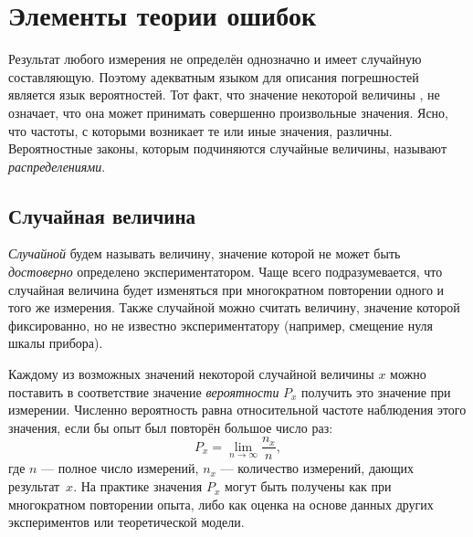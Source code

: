 \chapter{Элементы теории ошибок}
\label{ch:prob}


Результат любого измерения не определён однозначно и имеет случайную составляющую.
Поэтому адекватным языком для описания погрешностей является язык вероятностей.
Тот факт, что значение некоторой величины , не означает, что
она может принимать совершенно произвольные значения. Ясно, что частоты, с которыми
возникает те или иные значения, различны. Вероятностные законы, которым
подчиняются случайные величины, называют \emph{распределениями}.

\section{Случайная величина}

\emph{Случайной} будем называть величину, значение которой не может быть \emph{достоверно} определено экспериментатором. Чаще всего подразумевается, что случайная величина будет изменяться при многократном повторении одного и того же измерения. 
Также случайной можно считать величину, значение которой фиксированно, но не известно экспериментатору (например, смещение нуля шкалы прибора). 


Каждому из возможных значений некоторой случайной величины $x$ можно поставить
в соответствие значение \emph{вероятности} $P_x$ получить это значение при измерении.
Численно вероятность равна относительной частоте наблюдения этого значения, 
если бы опыт был повторён большое число раз:
 \[
 P_x = \lim_{n\to \infty} \frac{n_x}{n},
 \]
где $n$ --- полное число измерений, $n_x$ --- количество измерений, дающих результат~$x$. На практике значения $P_x$ могут быть получены как при многократном повторении опыта, либо как оценка на основе данных других экспериментов
или теоретической модели.

